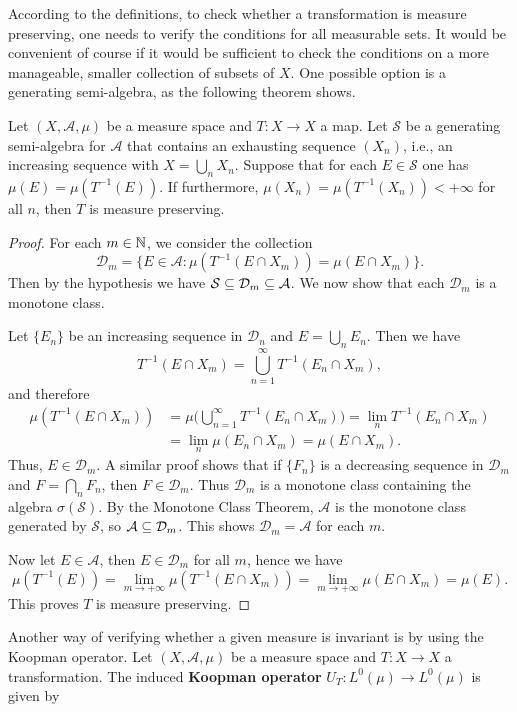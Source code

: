 According to the definitions, to check whether a transformation is measure preserving, one needs to verify the conditions for all measurable sets. It would be convenient of course if it would be sufficient to check the conditions on a more manageable, smaller collection of subsets of $X$. One possible option is a generating semi-algebra, as the following theorem shows.
\begin{theorem}\label{measure perserving iff on semi-algebra}
Let $(X,\mathcal{A},\mu)$ be a measure space and $T:X\to X$ a map. Let $\mathcal{S}$ be a generating semi-algebra for $\mathcal{A}$ that contains an exhausting sequence $(X_n)$, i.e., an increasing sequence with $X=\bigcup_nX_n$. Suppose that for each $E\in\mathcal{S}$ one has $\mu(E)=\mu(T^{-1}(E))$. If furthermore, $\mu(X_n)=\mu(T^{-1}(X_n))<+\infty$ for all $n$, then $T$ is measure preserving.
\end{theorem}
\begin{proof}
For each $m\in\mathbb{N}$, we consider the collection
\[\mathcal{D}_m=\{E\in\mathcal{A}:\mu(T^{-1}(E\cap X_m))=\mu(E\cap X_m)\}.\]
Then by the hypothesis we have $\mathcal{S}\subseteq\mathcal{D}_m\subseteq\mathcal{A}$. We now show that each $\mathcal{D}_m$ is a monotone class.\par
Let $\{E_n\}$ be an increasing sequence in $\mathcal{D}_n$ and $E=\bigcup_nE_n$. Then we have
\[T^{-1}(E\cap X_m)=\bigcup_{n=1}^{\infty}T^{-1}(E_n\cap X_m),\]
and therefore
\begin{align*}
\mu(T^{-1}(E\cap X_m))&=\mu\Big(\bigcup_{n=1}^{\infty}T^{-1}(E_n\cap X_m)\Big)=\lim_nT^{-1}(E_n\cap X_m)\\
&=\lim_n\mu(E_n\cap X_m)=\mu(E\cap X_m).
\end{align*}
Thus, $E\in\mathcal{D}_m$. A similar proof shows that if $\{F_n\}$ is a decreasing sequence in $\mathcal{D}_m$ and $F=\bigcap_nF_n$, then $F\in\mathcal{D}_m$. Thus $\mathcal{D}_m$ is a monotone class containing the algebra $\sigma(\mathcal{S})$. By the Monotone Class Theorem, $\mathcal{A}$ is the monotone class generated by $\mathcal{S}$, so $\mathcal{A}\subseteq\mathcal{D}_m$. This shows $\mathcal{D}_m=\mathcal{A}$ for each $m$.\par
Now let $E\in\mathcal{A}$, then $E\in\mathcal{D}_m$ for all $m$, hence we have 
\[\mu(T^{-1}(E))=\lim_{m\to+\infty}\mu(T^{-1}(E\cap X_m))=\lim_{m\to+\infty}\mu(E\cap X_m)=\mu(E).\]
This proves $T$ is measure preserving.
\end{proof}
Another way of verifying whether a given measure is invariant is by using the Koopman operator. Let $(X,\mathcal{A},\mu)$ be a measure space and $T:X\to X$ a transformation. The induced \textbf{Koopman operator} $U_T:L^0(\mu)\to L^0(\mu)$ is given by
